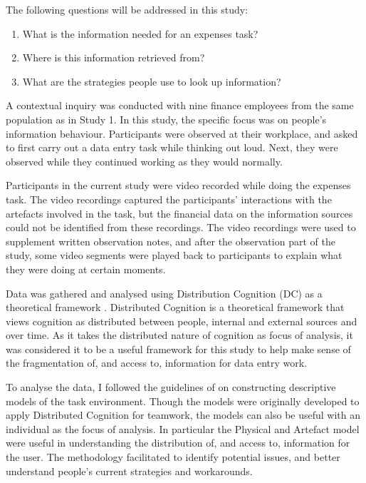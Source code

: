 The following questions will be addressed in this study:

\begin{enumerate}
\item 
What is the information needed for an expenses task?
\item 
Where is this information retrieved from?
\item 
What are the strategies people use to look up information?
\end{enumerate}

A contextual inquiry was conducted with nine finance employees from the same population as in Study 1. In this study, the specific focus was on people's information behaviour. Participants were observed at their workplace, and asked to first carry out a data entry task while thinking out loud. Next, they were observed while they continued working as they would normally.

Participants in the current study were video recorded while doing the expenses task. The video recordings captured the participants' interactions with the artefacts involved in the task, but the financial data on the information sources could not be identified from these recordings. The video recordings were used to supplement written observation notes, and after the observation part of the study, some video segments were played back to participants to explain what they were doing at certain moments.

Data was gathered and analysed using Distribution Cognition (DC) as a theoretical framework \citep{Hutchins1995}. Distributed Cognition is a theoretical framework that views cognition as distributed between people, internal and external sources and over time. 
As it takes the distributed nature of cognition as focus of analysis, it was considered it to be a useful framework for this study to help make sense of the fragmentation of, and access to, information for data entry work. 


To analyse the data, I followed the guidelines of \citet{Furniss2006} on constructing descriptive models of the task environment. Though the models were originally developed to apply Distributed Cognition for teamwork, the models can also be useful with an individual as the focus of analysis. In particular the Physical and Artefact model were useful in understanding the distribution of, and access to, information for the user. The methodology facilitated to identify potential issues, and better understand people’s current strategies and workarounds. 

